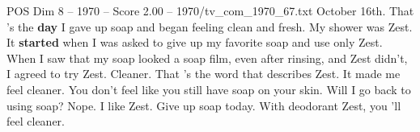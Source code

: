 \begin{textsample}{POS Dim 8 – 1970 – Score 2.00 – 1970/tv\_com\_1970\_67.txt}  \label{ex:f8_pos_083}
October 16th.
That 's the \textbf{day} I gave up soap and began feeling clean and fresh.
My shower was Zest.
It \textbf{started} when I was asked to give up my favorite soap and use only Zest.
When I saw that my soap looked a soap film, even after rinsing, and Zest didn't, I agreed to try Zest.
Cleaner.
That 's the word that describes Zest.
It made me feel cleaner.
You don't feel like you still have soap on your skin.
Will I go back to using soap?
Nope.
I like Zest.
Give up soap today.
With deodorant Zest, you 'll feel cleaner.

\end{textsample}
